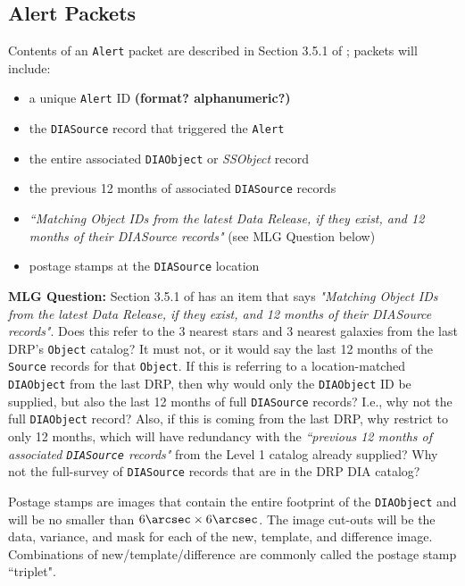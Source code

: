 \subsection{Alert Packets}\label{ssec:packets}

Contents of an {\tt Alert} packet are described in Section 3.5.1 of ; packets will include:
\begin{itemize}
\item a unique {\tt Alert} ID {\bf (format? alphanumeric?)}
\item the {\tt DIASource} record that triggered the {\tt Alert}
\item the entire associated {\tt DIAObject} or {\it SSObject} record
\item the previous 12 months of associated {\tt DIASource} records
\item {\it ``Matching Object IDs from the latest Data Release, if they exist, and 12 months of their DIASource records"} (see MLG Question below)
\item postage stamps at the {\tt DIASource} location
\end{itemize}

{\bf MLG Question:} Section 3.5.1 of  has an item that says {\it "Matching Object IDs from the latest Data Release, if they exist, and 12 months of their DIASource records"}. Does this refer to the 3 nearest stars and 3 nearest galaxies from the last DRP's {\tt Object} catalog? It must not, or it would say the last 12 months of the {\tt Source} records for that {\tt Object}. If this is referring to a location-matched {\tt DIAObject} from the last DRP, then why would only the {\tt DIAObject} ID be supplied, but also the last 12 months of full {\tt DIASource} records? I.e., why not the full {\tt DIAObject} record? Also, if this is coming from the last DRP, why restrict to only 12 months, which will have redundancy with the {\it ``previous 12 months of associated {\tt DIASource} records"} from the Level 1 catalog already supplied? Why not the full-survey of {\tt DIASource} records that are in the DRP DIA catalog? 

Postage stamps are images that contain the entire footprint of the {\tt DIAObject} and will be no smaller than $6\arcsec \times 6\arcsec$. The image cut-outs will be the data, variance, and mask for each of the new, template, and difference image. Combinations of new/template/difference are commonly called the postage stamp ``triplet".

